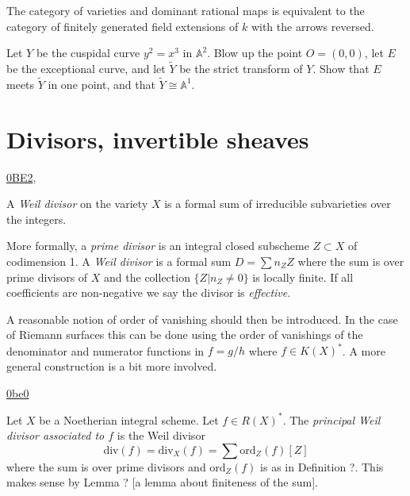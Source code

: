 \noindent
The category of varieties and dominant rational maps
is equivalent to the category of finitely generated
field extensions of $k$ with the arrows reversed.

\begin{exercise}
\label{exercise-cuspidal-curve-blow-up}
Let $Y$ be the cuspidal curve $y^2=x^3$ in $\mathbb{A}^2$.
Blow up the point $O=(0,0)$, let $E$ be the exceptional curve,
and let $\tilde{Y}$ be the strict transform of $Y$.
Show that $E$ meets $\tilde{Y}$ in one point,
and that $\tilde{Y} \cong \mathbb{A}^1$.
\end{exercise}


\section{Divisors, invertible sheaves}
\label{section-divisors-line-bundles}

\begin{definition}
\label{definition-weil-divisor}
\begin{reference}
\href{https://stacks.math.columbia.edu/tag/0BE2}{0BE2},
\cite[p. 130]{hart}
\end{reference}
A {\it Weil divisor} on the variety $X$ is a formal sum of irreducible
subvarieties over the integers.

More formally, a {\it prime divisor} is an integral closed
subscheme $Z \subset X$ of codimension 1.
A {\it Weil divisor} is a formal sum $D=\sum n_Z Z$ where
the sum is over prime divisors of $X$ 
and the collection
$\{Z|n_Z \neq  0\}$ is locally finite.
If all coefficients are non-negative we say
the divisor is {\it effective}.
\end{definition}

\noindent
A reasonable notion of order of vanishing
should then be introduced. In the case of Riemann surfaces
this can be done using the order of vanishings
of the denominator and numerator functions in 
$f=g/h$ where $f \in K(X)^*$.
A more general construction is a bit more involved.

\begin{definition}
\label{definition-principal-weil-divisor}
\begin{reference}
\href{https://stacks.math.columbia.edu/tag/0be0}{0be0}
\end{reference}
Let $X$ be a Noetherian integral scheme.
Let $f \in R(X)^*$.
The {\it principal Weil divisor associated to $f$} 
is the Weil divisor
$$
\text{div}(f)=\text{div}_X(f)
=\sum \text{ord}_Z(f)[Z]
$$
where the sum is over prime divisors and
$\text{ord}_Z(f)$ is as in Definition ?. 
This makes sense by Lemma ? [a lemma about finiteness of the sum].
\end{definition}

